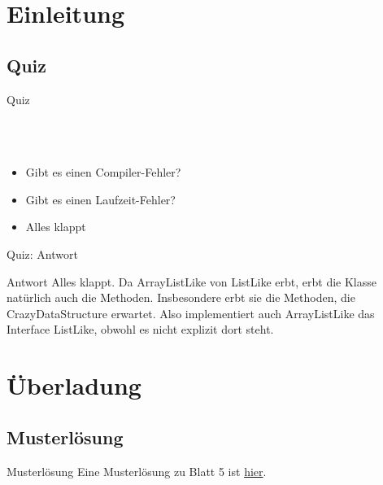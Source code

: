 \documentclass[usepdftitle=false,hyperref={pdfpagelabels=false}]{beamer}
\begin{document}
\title{\titleText}
\subtitle{Überladung, Bindung, List, Dictionarys}
\author{\tutor}
\date{\today}
\subject{Programmieren}

\frame{\titlepage}



\section{Einleitung}
\subsection{Quiz}
\begin{frame}{Quiz}
    \inputminted[linenos=true, numbersep=5pt, tabsize=4, fontsize=\tiny,frame=lines,label=Main.java]{java}{QuizMain.java}
    \inputminted[linenos=true, numbersep=5pt, tabsize=4, fontsize=\tiny]{java}{CrazyDataStructure.java}
    \inputminted[linenos=true, numbersep=5pt, tabsize=4, fontsize=\tiny]{java}{ListLike.java}
    \inputminted[linenos=true, numbersep=5pt, tabsize=4, fontsize=\tiny]{java}{ArrayListLike.java}
    \begin{itemize}
        \item Gibt es einen Compiler-Fehler?
        \item Gibt es einen Laufzeit-Fehler?
        \item Alles klappt
    \end{itemize}
\end{frame}

\begin{frame}{Quiz: Antwort}
    \begin{block}{Antwort}
        Alles klappt. Da ArrayListLike von ListLike erbt, erbt die
        Klasse natürlich auch die Methoden. Insbesondere erbt sie
        die Methoden, die CrazyDataStructure erwartet. Also
        implementiert auch ArrayListLike das Interface ListLike,
        obwohl es nicht explizit dort steht.
    \end{block}
\end{frame}

\section{Überladung}
\subsection{Musterlösung}
\begin{frame}{Musterlösung}
    Eine Musterlösung zu Blatt 5 ist 
    \href{https://github.com/MartinThoma/prog-ws1213/tree/master/Blatt-05/tutor-solution/Blatt5/src/mediabib}{hier}.
\end{frame}
\end{document}
